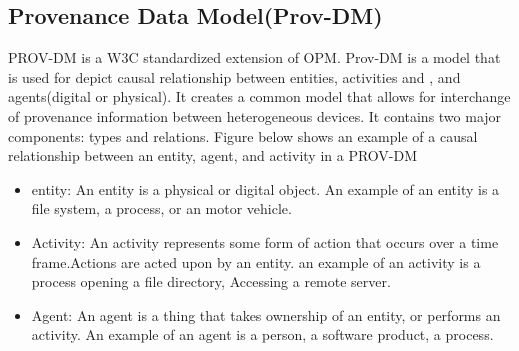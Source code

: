 
\subsection{Provenance Data Model(Prov-DM)}

PROV-DM is a W3C standardized extension of OPM. Prov-DM is a model that is used for depict causal relationship between entities, activities and , and agents(digital or physical).  It creates a common model that allows for interchange of provenance information between heterogeneous devices. It contains two major components: types and relations. Figure below shows an example of a causal relationship between an entity, agent, and activity in a PROV-DM

%
%
\begin{itemize}

\item entity: An entity is a physical or digital object. An example of an entity is a file system, a process, or an motor vehicle.

\item Activity: An activity represents some form of action that occurs over a time frame.Actions are acted upon by an entity. an example of an activity is a process opening a file directory, Accessing a remote server.

\item Agent: An agent is a thing that takes ownership of an entity, or performs an activity. An example of an agent is a person, a software product, a process.
\end{itemize}

